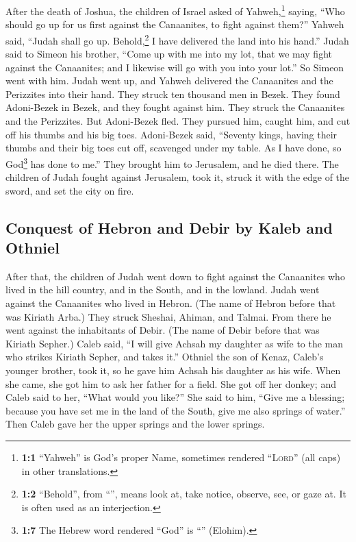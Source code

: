 \begin{paracol}{2}
\begin{otherlanguage}{english}
 After the death of Joshua, the children of Israel asked
of Yahweh,\footnote{\textbf{1:1} ``Yahweh'' is God's proper Name,
  sometimes rendered ``\textsc{Lord}'' (all caps) in other translations.}
saying, ``Who should go up for us first against the Canaanites, to fight
against them?''  Yahweh said, ``Judah shall go up.
Behold,\footnote{\textbf{1:2} ``Behold'', from ``'', means
  look at, take notice, observe, see, or gaze at. It is often used as an
  interjection.} I have delivered the land into his hand.''
 Judah said to Simeon his brother, ``Come up with me into
my lot, that we may fight against the Canaanites; and I likewise will go
with you into your lot.'' So Simeon went with him.  Judah
went up, and Yahweh delivered the Canaanites and the Perizzites into
their hand. They struck ten thousand men in Bezek.  They
found Adoni-Bezek in Bezek, and they fought against him. They struck the
Canaanites and the Perizzites.  But Adoni-Bezek fled. They
pursued him, caught him, and cut off his thumbs and his big toes.
 Adoni-Bezek said, ``Seventy kings, having their thumbs
and their big toes cut off, scavenged under my table. As I have done, so
God\footnote{\textbf{1:7} The Hebrew word rendered ``God'' is
  ``'' (Elohim).} has done to me.'' They brought him to
Jerusalem, and he died there.  The children of Judah
fought against Jerusalem, took it, struck it with the edge of the sword,
and set the city on fire.

\hypertarget{conquest-of-hebron-and-debir-by-kaleb-and-othniel}{%
\subsection{Conquest of Hebron and Debir by Kaleb and
Othniel}\label{conquest-of-hebron-and-debir-by-kaleb-and-othniel}}

 After that, the children of Judah went down to fight
against the Canaanites who lived in the hill country, and in the South,
and in the lowland.  Judah went against the Canaanites
who lived in Hebron. (The name of Hebron before that was Kiriath Arba.)
They struck Sheshai, Ahiman, and Talmai.  From there he
went against the inhabitants of Debir. (The name of Debir before that
was Kiriath Sepher.)  Caleb said, ``I will give Achsah my
daughter as wife to the man who strikes Kiriath Sepher, and takes it.''
 Othniel the son of Kenaz, Caleb's younger brother, took
it, so he gave him Achsah his daughter as his wife.  When
she came, she got him to ask her father for a field. She got off her
donkey; and Caleb said to her, ``What would you like?'' 
She said to him, ``Give me a blessing; because you have set me in the
land of the South, give me also springs of water.'' Then Caleb gave her
the upper springs and the lower springs.


\end{otherlanguage}
\end{paracol}
